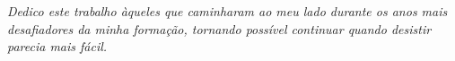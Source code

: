 \begin{dedicatoria}
   \vspace*{\fill}
   \centering
   \noindent
   \textit{Dedico este trabalho àqueles que caminharam ao meu lado durante os anos mais desafiadores da minha formação, tornando possível continuar quando desistir parecia mais fácil.} \vspace*{1cm}
\end{dedicatoria}
